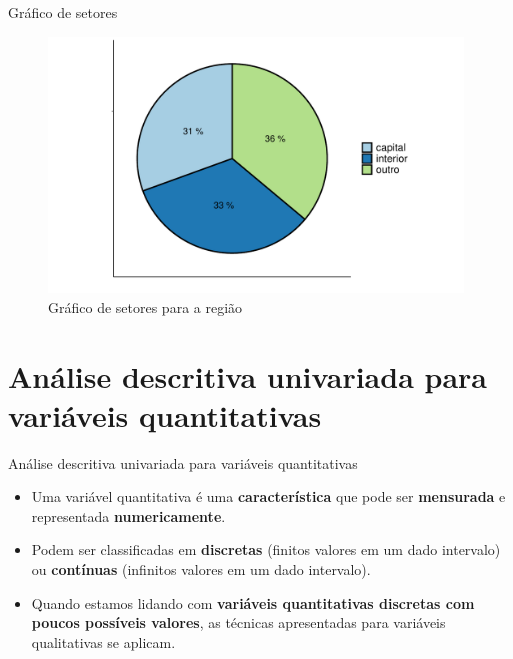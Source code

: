 \documentclass[
  ignorenonframetext,
  serif,
  professionalfont,
  usenames,
  dvipsnames,
  aspectratio = 169]{beamer}
\begin{document}
\begin{frame}{Gráfico de setores}
\label{gruxe1fico-de-setores-1}
\begin{figure}

{\centering \includegraphics[width=11cm]{encontro1_files/figure-beamer/unnamed-chunk-44-1} 

}

\caption{Gráfico de setores para a região}\label{fig:unnamed-chunk-44}
\end{figure}
\end{frame}

\section{Análise descritiva univariada para variáveis
quantitativas}\label{anuxe1lise-descritiva-univariada-para-variuxe1veis-quantitativas}

\begin{frame}{Análise descritiva univariada para variáveis
quantitativas}
\label{anuxe1lise-descritiva-univariada-para-variuxe1veis-quantitativas-1}
\begin{itemize}
\item
  Uma variável quantitativa é uma \textbf{característica} que pode ser
  \textbf{mensurada} e representada \textbf{numericamente}.
\item
  Podem ser classificadas em \textbf{discretas} (finitos valores em um
  dado intervalo) ou \textbf{contínuas} (infinitos valores em um dado
  intervalo).
\item
  Quando estamos lidando com
  \textbf{variáveis quantitativas discretas com poucos possíveis valores},
  as técnicas apresentadas para variáveis qualitativas se aplicam.
\end{itemize}
\end{frame}
\end{document}
